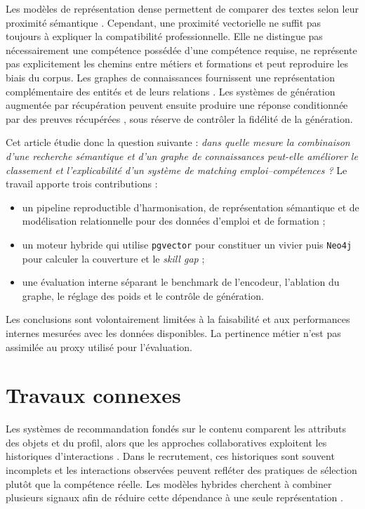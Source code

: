 \documentclass[10pt]{article}
\newcommand{\pgvector}{\texttt{pgvector}}
\newcommand{\neo}{\texttt{Neo4j}}
\begin{document}
Les modèles de représentation dense permettent de comparer des textes selon leur proximité sémantique \citep{reimers2019sbert,muennighoff2022sgpt}. Cependant, une proximité vectorielle ne suffit pas toujours à expliquer la compatibilité professionnelle. Elle ne distingue pas nécessairement une compétence possédée d'une compétence requise, ne représente pas explicitement les chemins entre métiers et formations et peut reproduire les biais du corpus. Les graphes de connaissances fournissent une représentation complémentaire des entités et de leurs relations \citep{hogan2021knowledge,schlichtkrull2018rgcn}. Les systèmes de génération augmentée par récupération peuvent ensuite produire une réponse conditionnée par des preuves récupérées \citep{lewis2020rag}, sous réserve de contrôler la fidélité de la génération.

Cet article étudie donc la question suivante : \emph{dans quelle mesure la combinaison d'une recherche sémantique et d'un graphe de connaissances peut-elle améliorer le classement et l'explicabilité d'un système de matching emploi--compétences ?} Le travail apporte trois contributions :
\begin{itemize}
  \item un pipeline reproductible d'harmonisation, de représentation sémantique et de modélisation relationnelle pour des données d'emploi et de formation ;
  \item un moteur hybride qui utilise \pgvector{} pour constituer un vivier puis \neo{} pour calculer la couverture et le \textit{skill gap} ;
  \item une évaluation interne séparant le benchmark de l'encodeur, l'ablation du graphe, le réglage des poids et le contrôle de génération.
\end{itemize}
Les conclusions sont volontairement limitées à la faisabilité et aux performances internes mesurées avec les données disponibles. La pertinence métier n'est pas assimilée au proxy utilisé pour l'évaluation.

\section{Travaux connexes}
Les systèmes de recommandation fondés sur le contenu comparent les attributs des objets et du profil, alors que les approches collaboratives exploitent les historiques d'interactions \citep{pazzani2007content,koren2009matrix,ricci2011recommender}. Dans le recrutement, ces historiques sont souvent incomplets et les interactions observées peuvent refléter des pratiques de sélection plutôt que la compétence réelle. Les modèles hybrides cherchent à combiner plusieurs signaux afin de réduire cette dépendance à une seule représentation \citep{burke2002hybrid}.
\end{document}
